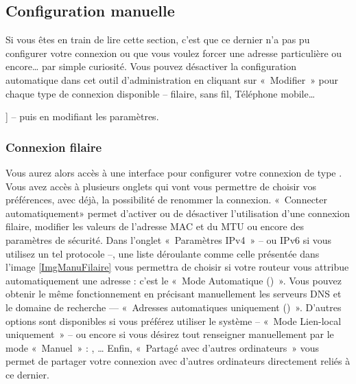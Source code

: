 \subsection{Configuration manuelle}
\label{ConfigReseauManuelle}
Si vous êtes en train de lire cette section, c'est que ce dernier n'a pas pu configurer votre connexion  ou que vous voulez forcer une adresse  particulière ou encore\dots{} par simple curiosité. Vous pouvez désactiver la configuration automatique dans cet outil d'administration en cliquant sur «~Modifier~» pour chaque type de connexion disponible -- filaire, sans fil, Téléphone mobile\ldots{] -- puis en modifiant les paramètres.
\subsubsection{Connexion filaire}
Vous aurez alors accès à une interface pour configurer votre connexion de type . Vous avez accès à plusieurs onglets qui vont vous permettre de choisir vos préférences, avec déjà, la possibilité de renommer la connexion. «~Connecter automatiquement» permet d'activer ou de désactiver l'utilisation d'une connexion filaire, modifier les valeurs de l'adresse MAC et du MTU ou encore des paramètres de sécurité. Dans l'onglet «~Paramètres IPv4~» -- ou IPv6 si vous utilisez un tel protocole --, une liste déroulante comme celle présentée dans l'image \ref{ImgManuFilaire} vous permettra de choisir si votre routeur vous attribue automatiquement une adresse  : c'est le «~Mode Automatique ()~». Vous pouvez obtenir le même fonctionnement en précisant manuellement les serveurs DNS et le domaine de recherche --- «~Adresses automatiques uniquement ()~». \label{RefAvahi} D'autres options sont disponibles si vous préférez utiliser le système  -- «~Mode Lien-local uniquement~» -- ou encore si vous désirez tout renseigner manuellement par le mode «~Manuel~» : , \ldots{} Enfin, «~Partagé avec d'autres ordinateurs~» vous permet de partager votre connexion avec d'autres ordinateurs directement reliés à ce dernier.
}
